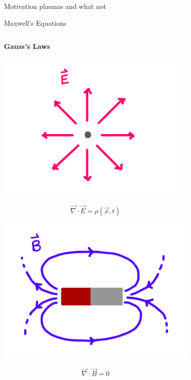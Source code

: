\documentclass[UKenglish]{beamer}
\begin{document}
\begin{frame}{Motivation}
plasmas and what not
\end{frame}

\begin{frame}{Maxwell's Equations}
    \begin{columns}[c] 

    
    \begin{center} \textbf{Gauss's Laws}
    
    \includegraphics[scale=.4]{figures/gauss_i.png}
    
    \vspace{-10mm}
    
    \small
    $$ \vec{\nabla} \cdot \vec{E} = \rho(\vec{x},t) $$
    
    \includegraphics[scale=.4]{figures/gauss_ii.png}
    
    \vspace{-10mm}
    
    $$ \vec{\nabla} \cdot \vec{B} = 0 $$
    
    \end{center}
    

\end{columns}
\end{frame}
\end{document}
